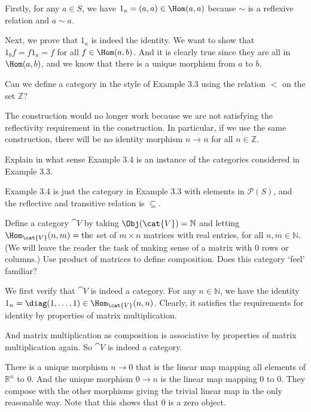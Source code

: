 \documentclass[parskip=full, draft]{scrartcl}
\begin{document}
\begin{sol}
    Firstly, for any \(a \in S\), we have \(1_a = (a, a) \in \Hom(a, a)\) because \(\sim\) is a reflexive relation and \(a\sim a\).

    Next, we prove that \(1_a\) is indeed the identity. We want to show that \(1_b f = f 1_a = f\) for all \(f \in \Hom(a, b)\). And it is clearly true since they are all in \(\Hom(a, b)\), and we know that there is a unique morphism from \(a\) to \(b\).
\end{sol}
\begin{prob}{4}
    Can we define a category in the style of Example 3.3 using the relation \(<\) on the set \(\mathbb{Z}\)?
\end{prob}
\begin{sol}
    The construction would no longer work because we are not satisfying the reflectivity requirement in the construction. In particular, if we use the same construction, there will be no identity morphism \(n \to n\) for all \(n \in \mathbb{Z}\).
\end{sol}
\begin{prob}{5}
    Explain in what sense Example 3.4 is an instance of the categories considered in Example 3.3. 
\end{prob}
\begin{sol}
    Example 3.4 is just the category in Example 3.3 with elements in \(\mathscr{P}(S)\), and the reflective and transitive relation is \(\subseteq\).
\end{sol}
\begin{prob}{6}
    Define a category \(\cat{V}\) by taking \(\Obj(\cat{V}) = \mathbb{N}\) and letting \(\Hom_{\cat{V}}(n, m) = \text{the} \) set of \(m \times n\) matrices with real entries, for all \(n, m \in \mathbb{N}\). (We will leave the reader the task of making sense of a matrix with 0 rows or columns.) Use product of matrices to define composition. Does this category `feel' familiar?
\end{prob}
\begin{sol}
    We first verify that \(\cat{V}\) is indeed a category. For any \(n \in \mathbb{N}\), we have the identity \(1_n = \diag(1, \dots, 1) \in \Hom_{\cat{V}}(n, n)\). Clearly, it satisfies the requirements for identity by properties of matrix multiplication.
    
    And matrix multiplication as composition is associative by properties of matrix multiplication again. So \(\cat{V}\) is indeed a category.
    
    There is a unique morphism \(n \to 0\) that is the linear map mapping all elements of \(\mathbb{R}^n\) to \(0\). And the unique morphism \(0 \to n\) is the linear map mapping \(0\) to \(0\). They compose with the other morphisms giving the trivial linear map in the only reasonable way. Note that this shows that \(0\) is a zero object.
\end{sol}
\end{document}
